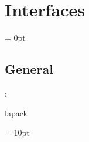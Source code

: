 
\section{Interfaces} 


\parskip = 0pt

\vspace{3mm} \subsection*{General}

: 

lapack
\vspace{2mm}

\vspace{5mm}\parskip = 10pt 

